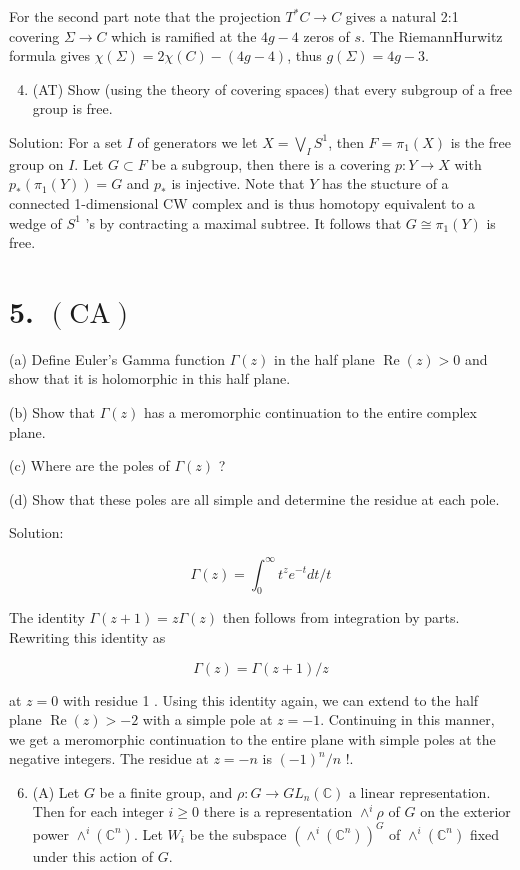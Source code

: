 \documentclass[10pt]{article}
\begin{document}
For the second part note that the projection $T^{*} C \rightarrow C$ gives a natural 2:1 covering $\Sigma \rightarrow C$ which is ramified at the $4 g-4$ zeros of $s$. The RiemannHurwitz formula gives $\chi(\Sigma)=2 \chi(C)-(4 g-4)$, thus $g(\Sigma)=4 g-3$.

\begin{enumerate}
  \setcounter{enumi}{3}
  \item (AT) Show (using the theory of covering spaces) that every subgroup of a free group is free.
\end{enumerate}

Solution: For a set $I$ of generators we let $X=\bigvee_{I} S^{1}$, then $F=\pi_{1}(X)$ is the free group on $I$. Let $G \subset F$ be a subgroup, then there is a covering $p: Y \rightarrow X$ with $p_{*}\left(\pi_{1}(Y)\right)=G$ and $p_{*}$ is injective. Note that $Y$ has the stucture of a connected 1-dimensional $\mathrm{CW}$ complex and is thus homotopy equivalent to a wedge of $S^{1}$ 's by contracting a maximal subtree. It follows that $G \cong \pi_{1}(Y)$ is free.

\section{5. $(\mathrm{CA})$}
(a) Define Euler's Gamma function $\Gamma(z)$ in the half plane $\operatorname{Re}(z)>0$ and show that it is holomorphic in this half plane.

(b) Show that $\Gamma(z)$ has a meromorphic continuation to the entire complex plane.

(c) Where are the poles of $\Gamma(z)$ ?

(d) Show that these poles are all simple and determine the residue at each pole.

Solution:

$$
\Gamma(z)=\int_{0}^{\infty} t^{z} e^{-t} d t / t
$$

The identity $\Gamma(z+1)=z \Gamma(z)$ then follows from integration by parts. Rewriting this identity as

$$
\Gamma(z)=\Gamma(z+1) / z
$$

at $z=0$ with residue 1 . Using this identity again, we can extend to the half plane $\operatorname{Re}(z)>-2$ with a simple pole at $z=-1$. Continuing in this manner, we get a meromorphic continuation to the entire plane with simple poles at the negative integers. The residue at $z=-n$ is $(-1)^{n} / n$ !.

\begin{enumerate}
  \setcounter{enumi}{5}
  \item (A) Let $G$ be a finite group, and $\rho: G \rightarrow G L_{n}(\mathbb{C})$ a linear representation. Then for each integer $i \geq 0$ there is a representation $\wedge^{i} \rho$ of $G$ on the exterior power $\wedge^{i}\left(\mathbb{C}^{n}\right)$. Let $W_{i}$ be the subspace $\left(\wedge^{i}\left(\mathbb{C}^{n}\right)\right)^{G}$ of $\wedge^{i}\left(\mathbb{C}^{n}\right)$ fixed under this action of $G$.
\end{enumerate}
\end{document}
